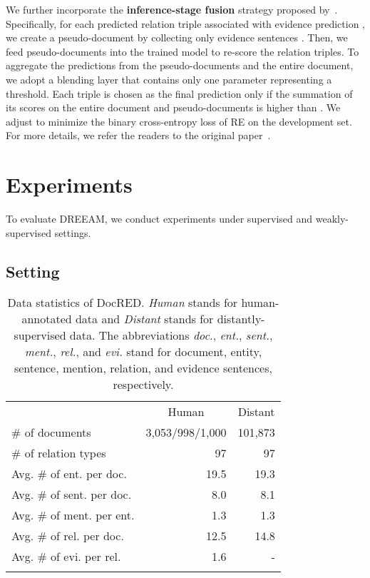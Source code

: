 \documentclass[11pt]{article}
\begin{document}
We further incorporate the \textbf{inference-stage fusion} strategy proposed by~\citet{xie-etal-2022-eider}. 
Specifically, for each predicted relation triple  associated with evidence prediction , we create a pseudo-document  by collecting only evidence sentences .
Then, we feed pseudo-documents into the trained model to re-score the relation triples.
To aggregate the predictions from the pseudo-documents and the entire document, we adopt a blending layer that contains only one parameter  representing a threshold.
Each triple  is chosen as the final prediction only if the summation of its scores on the entire document and pseudo-documents is higher than . 
We adjust  to minimize the binary cross-entropy loss of RE on the development set.
For more details, we refer the readers to the original paper~\cite{xie-etal-2022-eider}.

\section{Experiments}

To evaluate DREEAM, we conduct experiments under supervised and weakly-supervised settings.
\subsection{Setting}

\begin{table}[t]
    \centering
    \small
    \begin{tabular}{l|rr}
    \Xhline{3\arrayrulewidth}
         \multicolumn{1}{c|}{\textbf{Statistics}} & \multicolumn{1}{c}{Human} & \multicolumn{1}{c}{Distant} \\
         \Xhline{2\arrayrulewidth}
         \# of documents & 3,053/998/1,000 & 101,873\\
         \# of relation types & 97 & 97 \\
         Avg. \# of ent. per doc. & 19.5 & 19.3 \\
         Avg. \# of sent. per doc. & 8.0 & 8.1\\
         Avg. \# of ment. per ent. & 1.3 & 1.3 \\
         Avg. \# of rel. per doc. & 12.5 & 14.8 \\
         Avg. \# of evi. per rel. & 1.6 & -\\
    \Xhline{3\arrayrulewidth}
    \end{tabular}
    \caption{Data statistics of DocRED. \textit{Human} stands for human-annotated data and \textit{Distant} stands for distantly-supervised data. The abbreviations \textit{doc.}, \textit{ent.}, \textit{sent.}, \textit{ment.}, \textit{rel.}, and \textit{evi.} stand for document, entity, sentence, mention, relation, and evidence sentences, respectively.}
    \label{tab:dataset}
\end{table}
\end{document}
